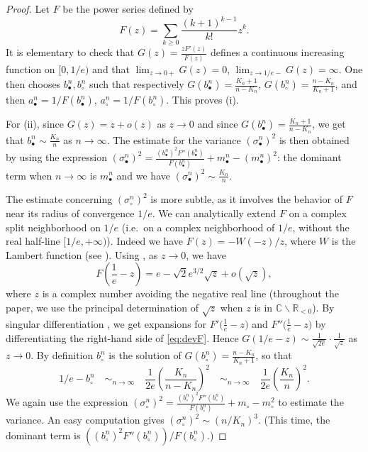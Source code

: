 \documentclass[10pt]{amsart}
\theoremstyle{definition}\newtheorem{defi}[theo]{Definition}\newtheorem{rema}[theo]{Remark}\newtheorem{exam}[theo]{Example}\newtheorem{exem}[theo]{Example}\newtheorem{nota}[theo]{Notation}
\newcommand{\R}{\mathbb{R}}
\newcommand{\CC}{\mathbb{C}}
\def\abn{a_{\bullet}^{n}}
\def\acn{a_{\circ}^{n}}
\def\bbn{b_{\bullet}^{n}}
\def\bcn{b_{\circ}^{n}}
\def\mbn{m_{\bullet}^{n}}
\def\scn{\sigma_{\circ}^{n}}
\def\sbn{\sigma_{\bullet}^{n}}
\begin{document}
\begin{proof}Let $F$ be the power series defined by
\begin{equation}
\label{eq:F}F(z)= \sum_{k \geq 0} \frac{(k+1)^{k-1}}{k!} z^{k}.
\end{equation}
It is elementary to check that $G(z)= \frac{z F'(z)}{F(z)}$ defines a continuous increasing function on $[0,1/e)$ and that $\lim_{z \rightarrow 0+} G(z)=0$, $\lim_{z \rightarrow 1/e-} G(z)=\infty$. One then chooses $\bbn, \bcn$ such that respectively $G(\bbn)=\frac{K_{n}+1}{n-K_{n}}$, $G(\bcn)= \frac{n-K_{n}}{K_{n}+1}$, and then $\abn=1/F(\bbn)$, $\acn=1/F(\bcn)$.
This proves (i).

For (ii), since $G(z)=z+o(z)$ as $z \rightarrow 0$ and since $G(\bbn)= \frac{K_{n}+1}{n-K_{n}}$, we get that $\bbn \sim \frac{K_{n}}{n}$ as $n \rightarrow \infty$.
The estimate for the variance $(\sbn)^{2}$ is then obtained by using the expression
\hbox{$(\sbn)^{2}= \frac{(\bbn)^{2} F''(\bbn)}{F(\bbn)}+\mbn-(\mbn)^{2}$:}
the dominant term when $n  \rightarrow \infty$ is $\mbn$
and we have \hbox{$(\sbn)^{2}\sim \frac{K_{n}}{n}$}.


The estimate concerning $(\scn)^{2}$ is more subtle, as it involves the behavior of $F$ near its radius of convergence $1/e$.
We can analytically extend $F$
on a complex split neighborhood on $1/e$ (i.e.\ on a complex neighborhood of $1/e$, without the real half-line $[1/e,+\infty)$).
Indeed we have $F(z)=-W(-z)/z$, where $W$ is the Lambert function (see \cite[Eq~3.1]{CGHJK96}).
Using \cite[Eq~4.22]{CGHJK96}, as $z \rightarrow 0$, we have
\begin{equation}
\label{eq:devF}F \left( \frac{1}{e}-z \right)=e- \sqrt{2} e^{3/2} \sqrt{z}+ o(\sqrt{z}),
\end{equation}
where $z$ is a complex number avoiding the negative real line
(throughout the paper, we use the principal determination of
$\sqrt{z}$ when $z$ is in $\CC \backslash \R_{<0}$).
By singular differentiation \cite[Theorem VI.8 p. 419]{FS09},
we get expansions for $F' \big( \tfrac{1}{e}-z \big)$ and $F'' \big( \tfrac{1}{e}-z \big)$
by differentiating the right-hand side of \eqref{eq:devF}.
Hence $G(1/e-z) \sim \frac{1}{\sqrt{2e}} \cdot \frac{1}{\sqrt{z}}$ as $z \rightarrow 0$.
By definition $\bcn$ is the solution of $G(\bcn)=\tfrac{n-K_n}{K_n+1}$, so that
\begin{equation}
  1/e-\bcn  \quad \mathop{\sim}_{n \rightarrow \infty} \quad  \frac{1}{2e} \left( \frac{K_n}{n-K_n}  \right)^{2}  \quad \mathop{\sim}_{n \rightarrow \infty} \quad  \frac{1}{2e} \left( \frac{K_n}{n}  \right)^{2}.
  \label{eq:est_bcirc}
\end{equation}
We again use the expression \hbox{$(\scn)^{2}= \frac{(\bcn)^{2} F''(\bcn)}{F(\bcn)}+m_{\circ}-m_{\circ}^{2}$}
to estimate the variance.
An easy computation gives $(\scn)^{2}\sim ( {n}/{K_{n}} )^{3}$.
(This time, the dominant term is $\left({(\bcn)^{2} F''(\bcn)}\right)\big/{F(\bcn)}$.)
\end{proof}
\end{document}
